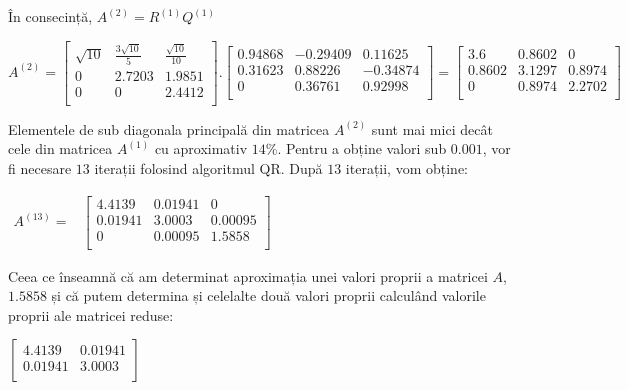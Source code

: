 \documentclass{exam}
\begin{document}
În consecință, $A^{(2)} = R^{(1)}Q^{(1)}$

$
	A^{(2)}=
	\left[\begin{array}{ccc}
			\sqrt{10} & \frac{3\sqrt{10}}{5} & \frac{\sqrt{10}}{10} \\
			0         & 2.7203               & 1.9851               \\
			0         & 0                    & 2.4412               \\
		\end{array}\right] .
	\left[\begin{array}{ccc}
			0.94868 & -0.29409 & 0.11625  \\
			0.31623 & 0.88226  & -0.34874 \\
			0       & 0.36761  & 0.92998  \\
		\end{array}\right]=
	\left[\begin{array}{ccc}
			3.6    & 0.8602 & 0      \\
			0.8602 & 3.1297 & 0.8974 \\
			0      & 0.8974 & 2.2702 \\
		\end{array}\right]
$

Elementele de sub diagonala principală din matricea $A^{(2)}$ sunt mai mici decât cele din matricea $A^{(1)}$ cu \mbox{aproximativ} $14\%$. Pentru a obține valori sub $0.001$, vor fi necesare $13$ iterații folosind algoritmul QR. După $13$ iterații, vom obține:

$\begin{array}{ccc}
		A^{(13)} = &
		\left[\begin{array}{ccc}
				      4.4139  & 0.01941 & 0       \\
				      0.01941 & 3.0003  & 0.00095 \\
				      0       & 0.00095 & 1.5858  \\
			      \end{array}\right]
	\end{array}$

Ceea ce înseamnă că am determinat aproximația unei valori proprii a matricei $A$, $1.5858$ și că putem determina și celelalte două valori proprii calculând valorile proprii ale matricei reduse:

$\begin{bmatrix}
		4.4139  & 0.01941 \\
		0.01941 & 3.0003  \\
	\end{bmatrix}$
\end{document}

